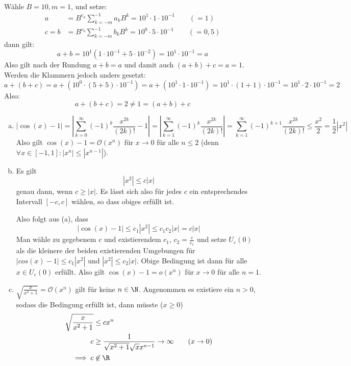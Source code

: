 \documentclass{scrartcl}
\begin{document}
\begin{aufgabe}~

Wähle $B=10, m=1$, und setze:
\begin{align*}
a &= B^{e_a}\sum_{k=-m}^{-1}a_kB^k=10^1\cdot 1\cdot 10^{-1} \qquad (=1)\\
c=b &= B^{e_b}\sum_{k=-m}^{-1}b_kB^k=10^0\cdot 5\cdot 10^{-1} \qquad (=0,5)
\end{align*}
dann gilt:
\[
a+b
=10^1(1\cdot 10^{-1}+5\cdot 10^{-2})
=10^1\cdot 10^{-1}
=a
\]
Also gilt nach der Rundung $a+b=a$ und damit auch $(a+b)+c=a=1$.
Werden die Klammern jedoch anders gesetzt:
\[
a+(b+c)
=a+(10^0\cdot (5+5)\cdot 10^{-1})
=a+(10^1\cdot 1 \cdot 10^{-1})
=10^1\cdot (1+1) \cdot 10^{-1}
=10^1\cdot 2\cdot 10^{-1}
=2
\]
Also:
\[
a+(b+c)=2\neq 1=(a+b)+c
\]
\end{aufgabe}

\begin{aufgabe}
	\begin{enumerate}[a)]
\item
\[
|\cos(x)-1|
=\left|\sum_{k=0}^\infty(-1)^k\frac {x^{2k}}{(2k)!}-1\right|
=\left|\sum_{k=1}^\infty(-1)^k\frac {x^{2k}}{(2k)!}\right|
=\sum_{k=1}^\infty(-1)^{k+1}\frac {x^{2k}}{(2k)!}
\le \frac {x^2}2
=\frac 12\left|x^2\right|
\]
Also gilt $\cos(x)-1=\mathcal O(x^n)$ für $x\to 0$ für alle $n\le 2$
(denn $\forall x\in [-1,1]:\left|x^n\right|\le \left|x^{n-1}\right|$).

\item
Es gilt
\[
\left|x^2\right|\le c|x|
\]
genau dann, wenn $c\ge|x|$. 
Es lässt sich also für jedes $c$ ein entsprechendes Intervall $[-c,c]$ wählen,
so dass obiges erfüllt ist.

Also folgt aus (a), dass
\[
|\cos(x)-1|\le c_1\left|x^2\right| \le c_1c_2|x|=c|x|
\]
Man wähle zu gegebenem $c$ und existierendem $c_1$, $c_2=\frac c{c_1}$ und setze
$U_\varepsilon(0)$ als die kleinere der beiden existierenden Umgebungen für
$|cos(x)-1|\le c_1\left|x^2\right|$ und $|x^2|\le c_2|x|$.
Obige Bedingung ist dann für alle $x\in U_\varepsilon(0)$ erfüllt.
Also gilt $\cos(x)-1=o(x^n)$ für $x\to 0$ für alle $n=1$.
\item
$\sqrt{\frac x{x^2+1}} = \mathcal O(x^n)$ gilt für keine $n\in\N$.
Angenommen es existiere ein $n>0$, sodass die Bedingung erfüllt ist, dann müsste ($x\ge 0$)
\begin{align*}
\sqrt{\frac x{x^2+1}} &\le cx^n\\
c&\ge \frac 1{\sqrt{x^2+1}\sqrt x x^{n-1}} \to \infty \qquad (x\to 0)\\
\implies c&\not\in\R
\end{align*}



\end{enumerate}
\end{aufgabe}
\end{document}
